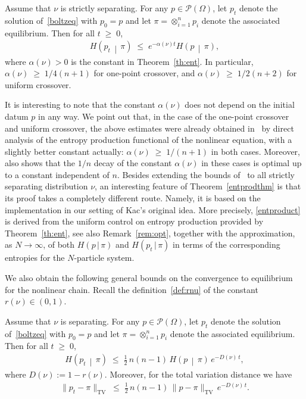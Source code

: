 \documentclass[AHL,Unicode,longabstracts,published]{cedram}
\renewcommand{\leq}{\;\leqslant\;}
\renewcommand{\geq}{\;\geqslant\;}
\newcommand{\tc}{\, |\, }
\newcommand{\tv}{\mathrm{TV}}
\newcommand{\cP}{\mathcal{P}}
\let\a=\alpha
\let\O=\Omega
\begin{document}
\begin{theo}\label{entprodthm}
Assume that $\nu$ is strictly separating. For any $p\in\cP(\O)$, let $p_t$ denote the solution of~\eqref{boltzeq} with $p_0=p$ and let $\pi=\otimes_{i=1}^n p_i$ denote the associated equilibrium. Then for all $t\geq 0$,
\begin{align}\label{entproduct}
H\left(p_t\,\middle|\, \pi\right) \leq e^{-\a(\nu) t}H\left(p\,\middle|\, \pi\right),
\end{align}
where $\a(\nu)>0$ is the constant in Theorem~\ref{th:ent}. In particular, $\a(\nu)\geq 1/4(n+1)$ for one-point crossover, and $\a(\nu)\geq 1/2(n+2)$ for uniform crossover.
\end{theo}

It is interesting to note that the constant $\a(\nu)$ does not depend on the initial datum $p$ in any way. We point out that, in the case of the one-point crossover and uniform crossover, the above estimates were already obtained in~\cite{entprod} by direct analysis of the entropy production functional of the nonlinear equation, with a slightly better constant actually: $\a(\nu)\geq 1/(n+1)$ in both cases. Moreover, \cite{entprod} also shows that the $1/n$ decay of the constant $\a(\nu)$ in these cases is optimal up to a constant independent of $n$. Besides extending the bounds of~\cite{entprod} to all strictly separating distribution $\nu$, an interesting feature of Theorem~\ref{entprodthm} is that its proof takes a completely different route. Namely, it is based on the implementation in our setting of Kac's original idea. More precisely, \eqref{entproduct} is derived from the uniform control on entropy production provided by Theorem~\ref{th:ent}, see also Remark~\ref{rem:opt}, together with the approximation, as $N\to\infty$, of both $H(p\tc\pi) $ and $H(p_t\tc\pi)$ in terms of the corresponding entropies for the $N$-particle system.

We also obtain the following general bounds on the convergence to equilibrium for the nonlinear chain. Recall the definition~\eqref{def:rnu} of the constant $r(\nu)\in(0,1)$.

\begin{theo}\label{prop:tvbo}
Assume that $\nu$ is separating. For any $p\in\cP(\O)$, let $p_t$ denote the solution of~\eqref{boltzeq} with $p_0=p$ and let $\pi=\otimes_{i=1}^n p_i$ denote the associated equilibrium. Then for all $t\geq 0$,
\begin{align}\label{entproductnoncontr}
H\left(p_t\,\middle|\, \pi\right) \leq \frac12\,n(n-1)\,H\left(p\,\middle|\, \pi\right)\,e^{-D(\nu)\,t},
\end{align}
where $D(\nu):=1-r(\nu)$. Moreover, for the total variation distance we have
\begin{align}\label{tvproduct}
\|p_t-\pi\|_\tv \leq \tfrac12\,n(n-1)\,\|p-\pi\|_\tv\,e^{-D(\nu)\, t}.
\end{align}
\end{theo}
\end{document}
